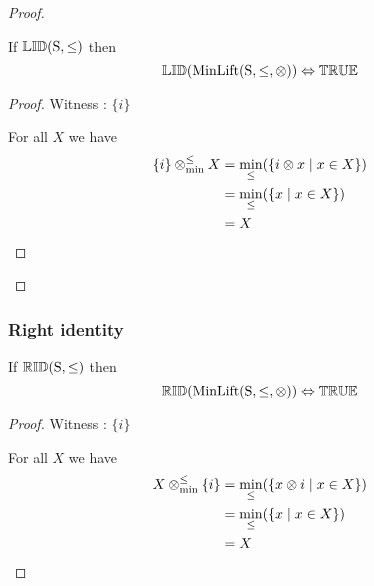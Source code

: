 \documentclass[../Summary.tex]{subfiles}
\begin{document}
\begin{proof}
\begin{theorem} \label{thm:minlift_lid}
If ${\mathbb{LID}}\mathrm{(S,\leq)}$ then
\begin{equation*}
{\mathbb{LID}}(\mathrm{MinLift(S,\leq,\otimes)}) \Leftrightarrow {\mathbb{TRUE}}
\end{equation*}
\end{theorem}

\begin{proof}

\vspace{0.5em}

Witness : $\{ i \}$

\vspace{0.5em}

For all $X$ we have
\begin{align*}
\{ i \} \mathbin{\otimes_{\min}^{\leq}} X 	& = \min_\leq(\{i \otimes x \mid x \in X\}) \\
					& = \min_\leq(\{x \mid x \in X\}) \\
					& = X
\end{align*}
\end{proof}
\end{proof}




\subsubsection{Right identity}

\begin{theorem} \label{thm:minlift_rid}
If ${\mathbb{RID}}\mathrm{(S,\leq)}$ then
\begin{equation*}
{\mathbb{RID}}(\mathrm{MinLift(S,\leq,\otimes)}) \Leftrightarrow {\mathbb{TRUE}}
\end{equation*}
\end{theorem}

\begin{proof}

\vspace{0.5em}

Witness : $\{ i \}$

\vspace{0.5em}

For all $X$ we have
\begin{align*}
X \mathbin{\otimes_{\min}^{\leq}} \{ i \} 	& = \min_\leq(\{x \otimes i \mid x \in X\}) \\
					& = \min_\leq(\{x \mid x \in X\}) \\
					& = X
\end{align*}
\end{proof}
\end{document}
